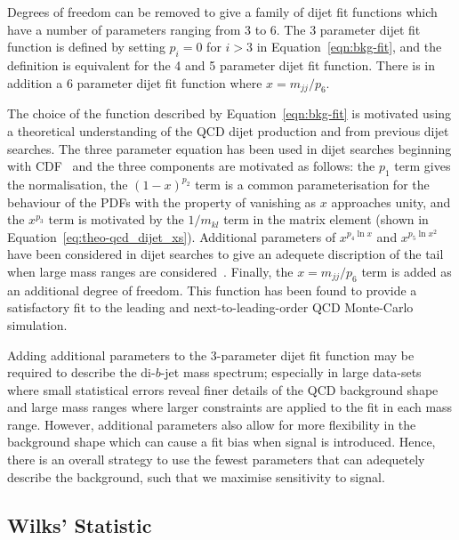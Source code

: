 Degrees of freedom can be removed to give a family of dijet fit functions which have a number of parameters ranging from 3 to 6.
The 3 parameter dijet fit function is defined by setting $p_{i} = 0$ for $i > 3$ in Equation~\ref{eqn:bkg-fit},
and the definition is equivalent for the 4 and 5 parameter dijet fit function.
There is in addition a 6 parameter dijet fit function where $x=m_{jj}/p_6$.

The choice of the function described by Equation~\ref{eqn:bkg-fit}
is motivated using a theoretical understanding of the QCD dijet production
and from previous dijet searches.
The three parameter equation has been used in dijet searches beginning with CDF~\cite{dijet-CDF_3par}
and the three components are motivated as follows:
the $p_1$ term gives the normalisation,
the $(1-x)^{p_2}$ term is a common parameterisation for the behaviour of the PDFs with the property of vanishing as $x$ approaches unity,
and the $x^{p_3}$ term is motivated by the $1/m_{kl}$ term in the matrix element (shown in Equation~\ref{eq:theo-qcd_dijet_xs}).
Additional parameters of $x^{p_4\ln{x}}$ and $x^{p_5\ln{x}^{2}}$ have been considered in dijet searches to give an adequete discription of the tail
when large mass ranges are considered~\cite{dijet-CDF_4par,dijet-mori16_int}.
Finally, the $x=m_{jj}/p_6$ term is added as an additional degree of freedom.
This function has been found to provide a satisfactory fit to the leading and next-to-leading-order QCD Monte-Carlo simulation.

Adding additional parameters to the 3-parameter dijet fit function may be required to describe the di-$b$-jet mass spectrum;
especially in large data-sets where small statistical errors reveal finer details of the QCD background shape
and large mass ranges where larger constraints are applied to the fit in each mass range.
However, additional parameters also allow for more flexibility in the background shape
which can cause a fit bias when signal is introduced.
Hence, there is an overall strategy to use the fewest parameters
that can adequetely describe the background,
such that we maximise sensitivity to signal.

\subsection{Wilks' Statistic}
\label{sec:bkg-bkg_wilks}

